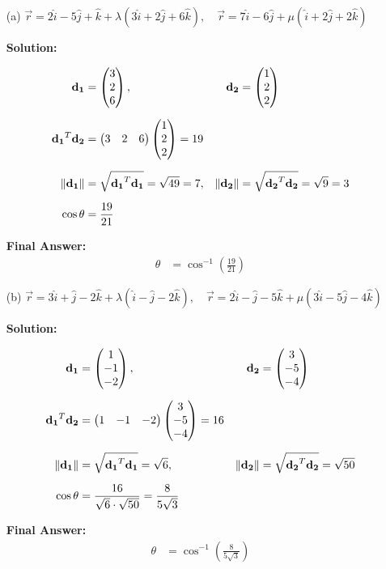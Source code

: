 \documentclass[12pt]{article}
\begin{document}
\begin{enumerate}
\item[(a)] 
$\vec{r} = 2\hat i - 5\hat j + \hat k + \lambda(3\hat i + 2\hat j + 6\hat k), 
\quad
\vec{r} = 7\hat i - 6\hat j + \mu(\hat i + 2\hat j + 2\hat k)$

\textbf{Solution:}  

\begin{align}
\mathbf{d_1} &= \begin{pmatrix}3 \\ 2 \\ 6\end{pmatrix}, &
\mathbf{d_2} &= \begin{pmatrix}1 \\ 2 \\ 2\end{pmatrix} \\[6pt]
\mathbf{d_1}^T \mathbf{d_2} &= \begin{pmatrix}3 & 2 & 6\end{pmatrix}\begin{pmatrix}1 \\ 2 \\ 2\end{pmatrix} = 19 \\[6pt]
\|\mathbf{d_1}\| &= \sqrt{\mathbf{d_1}^T \mathbf{d_1}} = \sqrt{49} = 7, &
\|\mathbf{d_2}\| &= \sqrt{\mathbf{d_2}^T \mathbf{d_2}} = \sqrt{9} = 3 \\[6pt]
\cos\theta &= \frac{19}{21}
\end{align}

\textbf{Final Answer:}  
\begin{align}
\theta &= \cos^{-1}\!\left(\tfrac{19}{21}\right)
\end{align}

\item[(b)] 
$\vec{r} = 3\hat i + \hat j - 2\hat k + \lambda(\hat i - \hat j - 2\hat k), 
\quad 
\vec{r} = 2\hat i - \hat j - 5\hat k + \mu(3\hat i - 5\hat j - 4\hat k)$

\textbf{Solution:}  

\begin{align}
\mathbf{d_1} &= \begin{pmatrix}1 \\ -1 \\ -2\end{pmatrix}, &
\mathbf{d_2} &= \begin{pmatrix}3 \\ -5 \\ -4\end{pmatrix} \\[6pt]
\mathbf{d_1}^T \mathbf{d_2} &= \begin{pmatrix}1 & -1 & -2\end{pmatrix}\begin{pmatrix}3 \\ -5 \\ -4\end{pmatrix} = 16 \\[6pt]
\|\mathbf{d_1}\| &= \sqrt{\mathbf{d_1}^T \mathbf{d_1}} = \sqrt{6}, &
\|\mathbf{d_2}\| &= \sqrt{\mathbf{d_2}^T \mathbf{d_2}} = \sqrt{50} \\[6pt]
\cos\theta &= \frac{16}{\sqrt{6}\cdot \sqrt{50}} = \frac{8}{5\sqrt{3}}
\end{align}

\textbf{Final Answer:}  
\begin{align}
\theta &= \cos^{-1}\!\left(\tfrac{8}{5\sqrt{3}}\right)
\end{align}


\end{enumerate}
\end{document}
